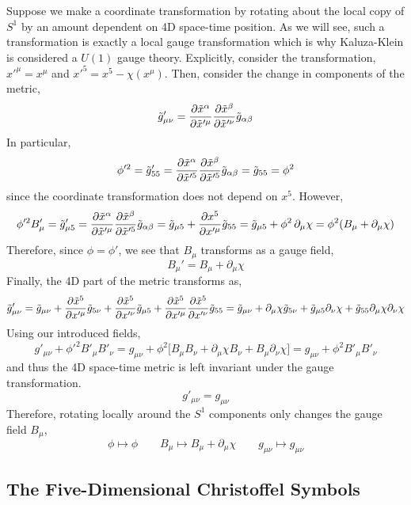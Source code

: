 \documentclass[11pt, a4paper]{article}
\begin{document}
Suppose we make a coordinate transformation by rotating about the local copy of $S^1$ by an amount dependent on 4D space-time position. As we will see, such a transformation is exactly a local gauge transformation which is why Kaluza-Klein is considered a $U(1)$ gauge theory. Explicitly, consider the transformation, $x'^\mu = x^\mu$ and $x'^5 = x^5 - \chi(x^\mu)$. Then, consider the change in components of the metric,
\[ \tilde{g}'_{\mu \nu} = \frac{\partial{\tilde{x}^\alpha}}{\partial{\tilde{x}'^\mu}} \frac{\partial{\tilde{x}^\beta}}{\partial{\tilde{x}'^\nu}} \tilde{g}_{\alpha \beta} \]
In particular,
\[ \phi'^2 = \tilde{g}'_{55} = \frac{\partial{\tilde{x}^\alpha}}{\partial{\tilde{x}'^5}} \frac{\partial{\tilde{x}^\beta}}{\partial{\tilde{x}'^5}} \tilde{g}_{\alpha \beta} = \tilde{g}_{55} = \phi^2 \]
since the coordinate transformation does not depend on $x^5$. However,
\[ \phi'^2 B'_\mu = \tilde{g}'_{\mu 5} = \frac{\partial{\tilde{x}^\alpha}}{\partial{\tilde{x}'^\mu}} \frac{\partial{\tilde{x}^\beta}}{\partial{\tilde{x}'^5}} \tilde{g}_{\alpha \beta} = \tilde{g}_{\mu 5} + \frac{\partial{x^5}}{\partial{x'^\mu}} \tilde{g}_{55} = \tilde{g}_{\mu 5} + \phi^2 \, \partial_\mu \chi = \phi^2 ( B_\mu + \partial_\mu \chi)\]
Therefore, since $\phi = \phi'$, we see that $B_\mu$ transforms as a gauge field,
\[ B_\mu' = B_\mu + \partial_\mu \chi \] 
Finally, the 4D part of the metric transforms as,
\[ \tilde{g}'_{\mu \nu} = \tilde{g}_{\mu \nu} + \frac{\partial{\tilde{x}^5}}{\partial{x'^\mu}}  \tilde{g}_{5 \nu} + \frac{\partial{\tilde{x}^5}}{\partial{x'^\nu}}  \tilde{g}_{\mu 5} + \frac{\partial{\tilde{x}^5}}{\partial{x'^\mu}} \frac{\partial{\tilde{x}^5}}{\partial{x'^\nu}}  \tilde{g}_{5 5} = \tilde{g}_{\mu \nu} + \partial_\mu \chi \tilde{g}_{5 \nu} + \tilde{g}_{\mu 5} \partial_\nu \chi + \tilde{g}_{55} \partial_\mu \chi \partial_\nu \chi  \]
Using our introduced fields,
\[ g'_{\mu \nu} + \phi'^2 B'_\mu B'_\nu = g_{\mu \nu} + \phi^2 \bigg[ B_\mu B_\nu + \partial_\mu \chi B_\nu + B_\mu \partial_\nu \chi \bigg] = g_{\mu \nu} + \phi^2 B'_\mu B'_\nu \]
and thus the 4D space-time metric is left invariant under the gauge transformation. 
\[ g'_{\mu \nu} = g_{\mu \nu} \]
Therefore, rotating locally around the $S^1$ components only changes the gauge field $B_\mu$,
\[ \phi \mapsto \phi \quad \quad B_\mu \mapsto B_\mu + \partial_\mu \chi \quad \quad g_{\mu \nu} \mapsto g_{\mu \nu} \]


\subsection{The Five-Dimensional Christoffel Symbols}
\end{document}
